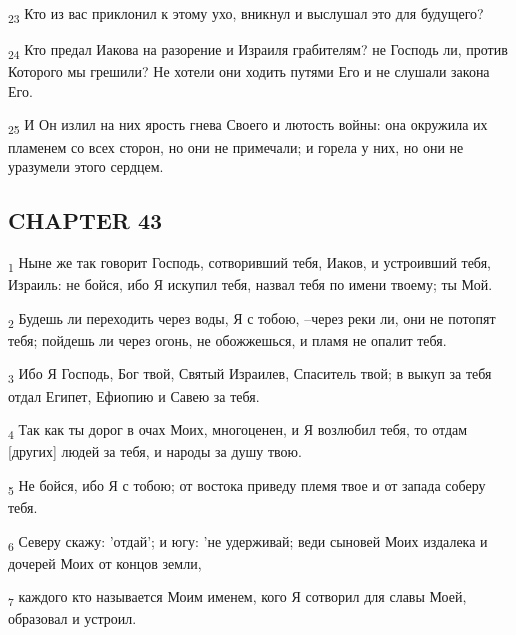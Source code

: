 \begin{tcolorbox}
\textsubscript{23} Кто из вас приклонил к этому ухо, вникнул и выслушал это для будущего?
\end{tcolorbox}
\begin{tcolorbox}
\textsubscript{24} Кто предал Иакова на разорение и Израиля грабителям? не Господь ли, против Которого мы грешили? Не хотели они ходить путями Его и не слушали закона Его.
\end{tcolorbox}
\begin{tcolorbox}
\textsubscript{25} И Он излил на них ярость гнева Своего и лютость войны: она окружила их пламенем со всех сторон, но они не примечали; и горела у них, но они не уразумели этого сердцем.
\end{tcolorbox}
\subsection{CHAPTER 43}
\begin{tcolorbox}
\textsubscript{1} Ныне же так говорит Господь, сотворивший тебя, Иаков, и устроивший тебя, Израиль: не бойся, ибо Я искупил тебя, назвал тебя по имени твоему; ты Мой.
\end{tcolorbox}
\begin{tcolorbox}
\textsubscript{2} Будешь ли переходить через воды, Я с тобою, --через реки ли, они не потопят тебя; пойдешь ли через огонь, не обожжешься, и пламя не опалит тебя.
\end{tcolorbox}
\begin{tcolorbox}
\textsubscript{3} Ибо Я Господь, Бог твой, Святый Израилев, Спаситель твой; в выкуп за тебя отдал Египет, Ефиопию и Савею за тебя.
\end{tcolorbox}
\begin{tcolorbox}
\textsubscript{4} Так как ты дорог в очах Моих, многоценен, и Я возлюбил тебя, то отдам [других] людей за тебя, и народы за душу твою.
\end{tcolorbox}
\begin{tcolorbox}
\textsubscript{5} Не бойся, ибо Я с тобою; от востока приведу племя твое и от запада соберу тебя.
\end{tcolorbox}
\begin{tcolorbox}
\textsubscript{6} Северу скажу: 'отдай'; и югу: 'не удерживай; веди сыновей Моих издалека и дочерей Моих от концов земли,
\end{tcolorbox}
\begin{tcolorbox}
\textsubscript{7} каждого кто называется Моим именем, кого Я сотворил для славы Моей, образовал и устроил.
\end{tcolorbox}
